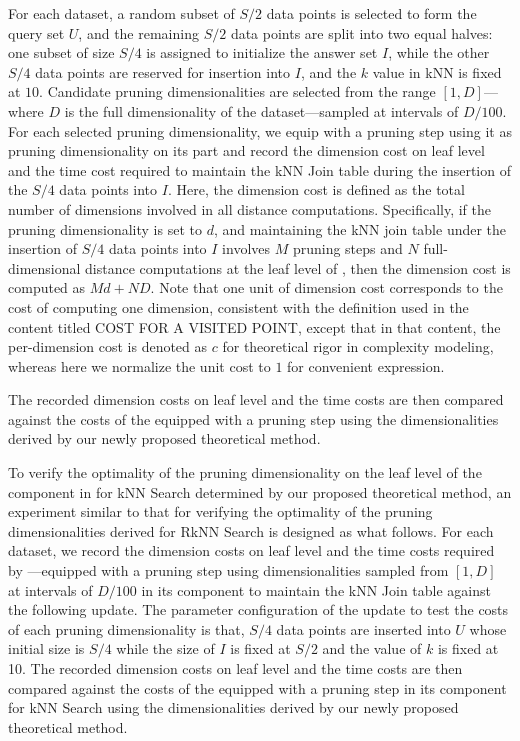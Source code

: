 For each dataset, a random subset of $S/2$ data points is selected to form the query set $U$, and the remaining $S/2$ data points are split into two equal halves: one subset of size $S/4$ is assigned to initialize the answer set $I$, while the other $S/4$ data points are reserved for insertion into $I$, and the $k$ value in kNN is fixed at $10$. Candidate pruning dimensionalities are selected from the range $[1, D]$—where $D$ is the full dimensionality of the dataset—sampled at intervals of $D/100$. For each selected pruning dimensionality, we equip \dualtree with a pruning step using it as pruning dimensionality on its \hdrtree part and record the dimension cost on leaf level and the time cost required to maintain the kNN Join table during the insertion of the $S/4$ data points into $I$. Here, the dimension cost is defined as the total number of dimensions involved in all distance computations. Specifically, if the pruning dimensionality is set to $d$, and maintaining the kNN join table under the insertion of $S/4$ data points into $I$ involves $M$ pruning steps and $N$ full-dimensional distance computations at the leaf level of \dualtree, then the dimension cost is computed as $Md + ND$. Note that one unit of dimension cost corresponds to the cost of computing one dimension, consistent with the definition used in the content titled COST FOR A VISITED POINT, except that in that content, the per-dimension cost is denoted as $c$ for theoretical rigor in complexity modeling, whereas here we normalize the unit cost to $1$ for convenient expression.

The recorded dimension costs on leaf level and the time costs are then compared against the costs of the \dualtree equipped with a pruning step using the dimensionalities derived by our newly proposed theoretical method.

To verify the optimality of the pruning dimensionality on the leaf level of the \deltatree component in \dualtree for kNN Search determined by our proposed theoretical method, an experiment similar to that for verifying the optimality of the pruning dimensionalities derived for RkNN Search is designed as what follows. For each dataset, we record the dimension costs on leaf level and the time costs required by \dualtree—equipped with a pruning step using dimensionalities sampled from $[1, D]$ at intervals of $D/100$ in its \deltatree component to maintain the kNN Join table against the following update. The parameter configuration of the update to test the costs of each pruning dimensionality is that, $S/4$ data points are inserted into $U$ whose initial size is $S/4$ while the size of $I$ is fixed at $S/2$ and the value of $k$ is fixed at 10. The recorded dimension costs on leaf level and the time costs are then compared against the costs of the \dualtree equipped with a pruning step in its \deltatree component for kNN Search using the dimensionalities derived by our newly proposed theoretical method.

